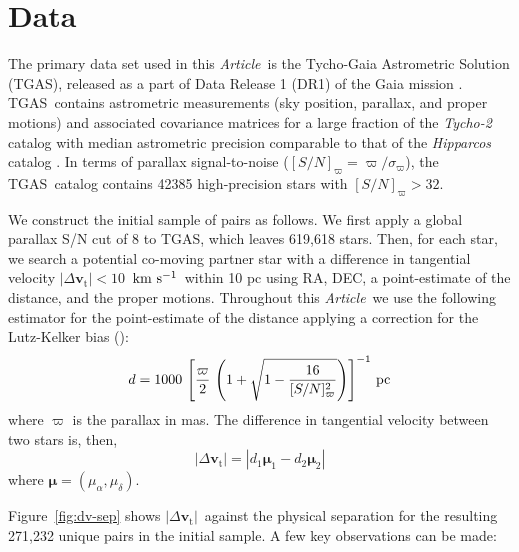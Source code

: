\documentclass[manuscript, letterpaper]{aastex6}
\newcommand{\project}[1]{\textsl{#1}}
\newcommand{\acronym}[1]{{\small{#1}}}
\newcommand{\documentname}{\textsl{Article}}
\newcommand{\dr}{\acronym{DR1}}
\newcommand{\tgas}{\acronym{TGAS}}
\newcommand{\bs}[1]{\boldsymbol{#1}}
\renewcommand{\vec}[1]{\bs{#1}}
\newcommand{\kms}{\ensuremath{\rm km~s^{-1}}}
\newcommand{\snr}{[S/N]_\varpi}
\newcommand{\absdvtan}{\ensuremath{|\Delta\vec v_\mathrm{t}|}}
\begin{document}


\section{Data} \label{sec:data}

The primary data set used in this \documentname\ is the Tycho-Gaia Astrometric
Solution (\tgas), released as a part of Data Release 1 (\dr) of the Gaia mission
\citep{Gaia-Collaboration:2016aa,Lindegren:2016aa}.
\tgas\ contains astrometric measurements (sky position,
parallax, and proper motions) and associated covariance matrices for a large
fraction of the \project{Tycho-2} catalog \citep{2000A&A...355L..27H} with median
astrometric precision comparable to that of the \project{Hipparcos} catalog
\citep[$\approx 0.3~{\rm mas}$;][]{2007ASSL..350.....V}. In terms of parallax
signal-to-noise ($\snr = \varpi/\sigma_\varpi$), the \tgas\ catalog contains
42385 high-precision stars with $\snr > 32$.

We construct the initial sample of pairs as follows.
We first apply a global parallax S/N cut of 8 to \tgas, which leaves 619,618 stars.
Then, for each star, we search a potential co-moving partner star with a
difference in tangential velocity $\absdvtan < 10$~\kms\ within 10 pc
using RA, DEC, a point-estimate of the distance, and the proper motions.
Throughout this \documentname\, we use the following estimator for
the point-estimate of the distance applying a correction for the Lutz-Kelker bias
(\citealt{Lutz:1973aa}):
\begin{equation}
  d = 1000 \, \left[\frac{\varpi}{2} \,
    \left(1 + \sqrt{1 - \frac{16}{\snr^2}} \right) \right]^{-1} \, {\rm pc}
    \label{eq:dist}
\end{equation}
where $\varpi$ is the parallax in mas.
The difference in tangential velocity between two stars is, then,
\begin{equation}
  \absdvtan = |d_1 \vec\mu_1 - d_2 \vec\mu_2|
\end{equation}
where $\vec\mu = (\mu_\alpha, \mu_\delta)$.

Figure~\ref{fig:dv-sep} shows \absdvtan\ against the physical separation
for the resulting 271,232 unique pairs in the initial sample.
A few key observations can be made:
\end{document}

